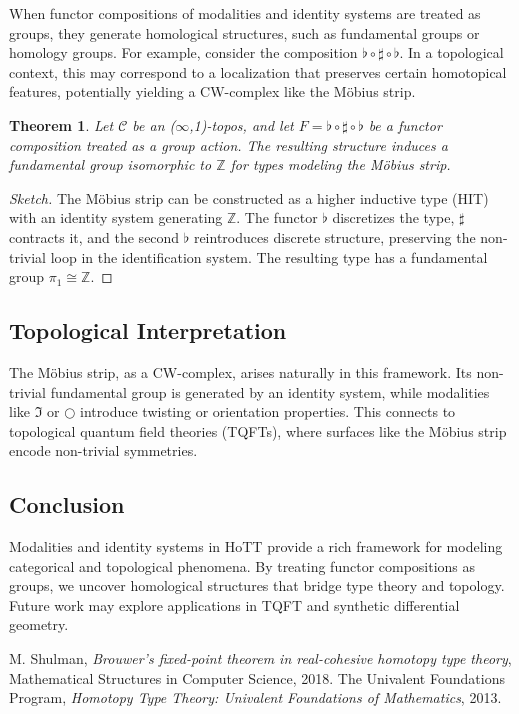 \documentclass[12pt]{article}
\theoremstyle{definition}
\theoremstyle{plain}
\newtheorem{theorem}{Theorem}
\begin{document}
When functor compositions of modalities and identity systems are treated as groups, they generate homological structures, such as fundamental groups or homology groups. For example, consider the composition $\flat \circ \sharp \circ \flat$. In a topological context, this may correspond to a localization that preserves certain homotopical features, potentially yielding a CW-complex like the Möbius strip.

\begin{theorem}
Let $\mathcal{C}$ be an ($\infty$,1)-topos, and let $F = \flat \circ \sharp \circ \flat$ be a functor composition treated as a group action. The resulting structure induces a fundamental group isomorphic to $\mathbb{Z}$ for types modeling the Möbius strip.
\end{theorem}

\begin{proof}[Sketch]
The Möbius strip can be constructed as a higher inductive type (HIT) with an identity system generating $\mathbb{Z}$. The functor $\flat$ discretizes the type, $\sharp$ contracts it, and the second $\flat$ reintroduces discrete structure, preserving the non-trivial loop in the identification system. The resulting type has a fundamental group $\pi_1 \cong \mathbb{Z}$.
\end{proof}

\subsection{Topological Interpretation}

The Möbius strip, as a CW-complex, arises naturally in this framework. Its non-trivial fundamental group is generated by an identity system, while modalities like $\Im$ or $\bigcirc$ introduce twisting or orientation properties. This connects to topological quantum field theories (TQFTs), where surfaces like the Möbius strip encode non-trivial symmetries.

\subsection{Conclusion}

Modalities and identity systems in HoTT provide a rich framework for modeling categorical and topological phenomena. By treating functor compositions as groups, we uncover homological structures that bridge type theory and topology. Future work may explore applications in TQFT and synthetic differential geometry.

\begin{thebibliography}{9}
M. Shulman, \emph{Brouwer’s fixed-point theorem in real-cohesive homotopy type theory}, Mathematical Structures in Computer Science, 2018.
The Univalent Foundations Program, \emph{Homotopy Type Theory: Univalent Foundations of Mathematics}, 2013.
\end{thebibliography}
\end{document}
